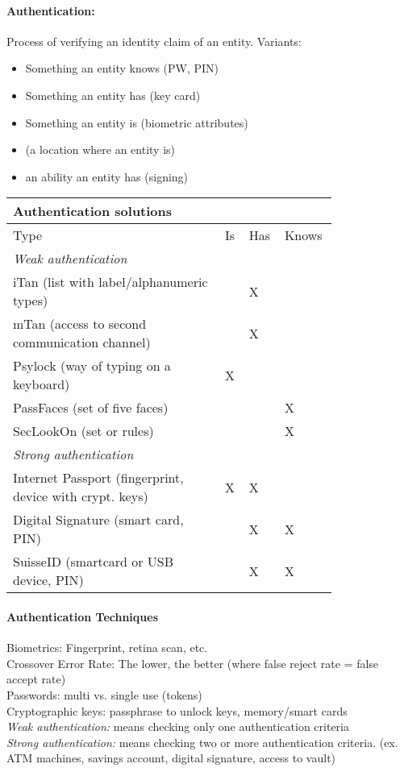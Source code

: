 \paragraph{Authentication:} Process of verifying an identity claim of an entity. Variants:
\begin{itemize}
\item Something an entity knows (PW, PIN)
\item Something an entity has (key card)
\item Something an entity is (biometric attributes) 
\item (a location where an entity is)
\item an ability an entity has (signing)
\end{itemize}

\begin{tabular}{|p{0.6\linewidth}|p{0.05\linewidth}|p{0.05\linewidth}|p{0.1\linewidth}|}
\multicolumn{4}{l}{\textbf{Authentication solutions}} \\
\hline
Type & Is & Has & Knows \\
\hline
\hline
\multicolumn{4}{l}{\textit{Weak authentication}} \\
\hline
iTan (list with label/alphanumeric types) & & X & \\
\hline
mTan (access to second communication channel) & & X & \\
\hline
Psylock (way of typing on a keyboard) & X & & \\
\hline
PassFaces (set of five faces) & & & X \\
\hline
SecLookOn (set or rules) & & & X \\
\hline
\multicolumn{4}{l}{\textit{Strong authentication}} \\
\hline
Internet Passport (fingerprint, device with crypt. keys) & X & X & \\
\hline
Digital Signature (smart card, PIN) & & X & X \\
\hline
SuisseID (smartcard or USB device, PIN) & & X & X \\
\hline
\end{tabular}

\paragraph{Authentication Techniques}
Biometrics: Fingerprint, retina scan, etc.\\
Crossover Error Rate: The lower, the better (where false reject rate = false accept rate) \\
Passwords: multi vs. single use (tokens) \\
Cryptographic keys: passphrase to unlock keys, memory/smart cards \\
\emph{Weak authentication:} means checking only
one authentication criteria \\
\emph{Strong authentication:} means checking two or more authentication criteria. (ex. ATM machines, savings account, digital signature, access to vault)

